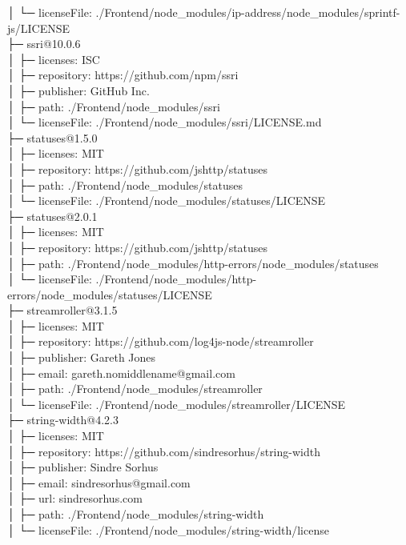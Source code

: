 │  └─ licenseFile: ./Frontend/node\_modules/ip-address/node\_modules/sprintf-js/LICENSE\\
├─ ssri@10.0.6\\
│  ├─ licenses: ISC\\
│  ├─ repository: https://github.com/npm/ssri\\
│  ├─ publisher: GitHub Inc.\\
│  ├─ path: ./Frontend/node\_modules/ssri\\
│  └─ licenseFile: ./Frontend/node\_modules/ssri/LICENSE.md\\
├─ statuses@1.5.0\\
│  ├─ licenses: MIT\\
│  ├─ repository: https://github.com/jshttp/statuses\\
│  ├─ path: ./Frontend/node\_modules/statuses\\
│  └─ licenseFile: ./Frontend/node\_modules/statuses/LICENSE\\
├─ statuses@2.0.1\\
│  ├─ licenses: MIT\\
│  ├─ repository: https://github.com/jshttp/statuses\\
│  ├─ path: ./Frontend/node\_modules/http-errors/node\_modules/statuses\\
│  └─ licenseFile: ./Frontend/node\_modules/http-errors/node\_modules/statuses/LICENSE\\
├─ streamroller@3.1.5\\
│  ├─ licenses: MIT\\
│  ├─ repository: https://github.com/log4js-node/streamroller\\
│  ├─ publisher: Gareth Jones\\
│  ├─ email: gareth.nomiddlename@gmail.com\\
│  ├─ path: ./Frontend/node\_modules/streamroller\\
│  └─ licenseFile: ./Frontend/node\_modules/streamroller/LICENSE\\
├─ string-width@4.2.3\\
│  ├─ licenses: MIT\\
│  ├─ repository: https://github.com/sindresorhus/string-width\\
│  ├─ publisher: Sindre Sorhus\\
│  ├─ email: sindresorhus@gmail.com\\
│  ├─ url: sindresorhus.com\\
│  ├─ path: ./Frontend/node\_modules/string-width\\
│  └─ licenseFile: ./Frontend/node\_modules/string-width/license\\
